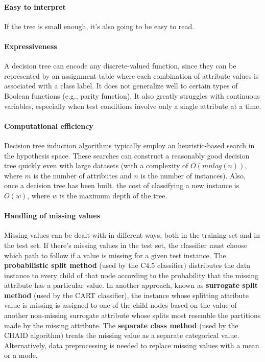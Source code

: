 \paragraph{Easy to interpret}
If the tree is small enough, it's also going to be easy to read.

\paragraph{Expressiveness}
A decision tree can encode any discrete-valued function, since they can be represented by an assignment table where each combination of attribute values is associated with a class label. It does not generalize well to certain types of Boolean functions (e.g., parity function). It also greatly struggles with continuous variables, especially when test conditions involve only a single attribute at a time.

\paragraph{Computational efficiency}
Decision tree induction algorithms typically employ an heuristic-based search in the hypothesis space. These searches can construct a reasonably good decision tree quickly even with large datasets (with a complexity of $O(m nlog(n))$, where $m$ is the number of attributes and $n$ is the number of instances). Also, once a decision tree has been built, the cost of classifying a new instance is $O(w)$, where $w$ is the maximum depth of the tree.

\paragraph{Handling of missing values}
Missing values can be dealt with in different ways, both in the training set and in the test set. If there's missing values in the test set, the classifier must choose which path to follow if a value is missing for a given test instance. The \textbf{probabilistic split method} (used by the C4.5 classifier) distributes the data instance to every child of that node according to the probability that the missing attribute has a particular value. In another approach, known as \textbf{surrogate split method} (used by the CART classifier), the instance whose splitting attribute value is missing is assigned to one of the child nodes based on the value of another non-missing surrogate attribute whose splits most resemble the partitions made by the missing attribute. The \textbf{separate class method} (used by the CHAID algorithm) treats the missing value as a separate categorical value. Alternatively, data preprocessing is needed to replace missing values with a mean or a mode.

